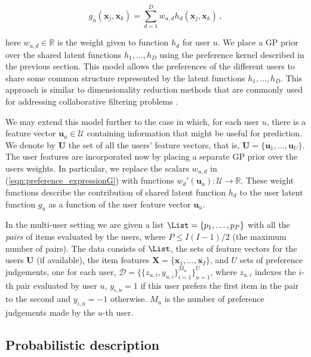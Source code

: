 \begin{equation}
	g_{u}(\mathbf{x}_j,\mathbf{x}_k)=\sum_{d=1}^{D}w_{u,d}h_{d}(\mathbf{x}_j,\mathbf{x}_k)\,,\label{eqn:preference_expressionG}
\end{equation}

here $w_{u,d}\in \mathbb{R}$ is the weight given to function $h_d$ for user $u$. We place a GP prior over the shared latent functions $h_{1},\ldots,h_{D}$ using the preference kernel described in the previous section. This model allows the preferences of the different users to share some common structure represented by the latent functions $h_{1},\ldots,h_{D}$. This approach is similar to dimensionality reduction methods that are commonly used for addressing collaborative filtering problems \cite{stern2009,raiko2007}.

We may extend this model further to the case in which, for each user $u$, there is a feature vector $\mathbf{u}_u \in \mathcal{U}$ containing information that might be useful for prediction. We denote by $\mathbf{U}$ the set of all the users' feature vectors, that is, $\mathbf{U} = \{\mathbf{u}_1,\ldots,\mathbf{u}_U\}$. The user features are incorporated now by placing a separate GP prior over the users weights. In particular, we replace the scalars $w_{u,d}$ in (\ref{eqn:preference_expressionG}) with functions $w_d'(\mathbf{u}_u):\mathcal{U}\rightarrow\mathcal{\mathbb{R}}$.  These weight functions describe the contribution of shared latent function $h_d$ to the user latent function $g_u$ as a function of the user feature vector $\mathbf{u}_u$.

In the multi-user setting we are given a list
$\List=\{p_1,\ldots,p_P\}$ with all the \emph{pairs} of items evaluated by the users, where $P\leq I(I-1)/2$ (the maximum number of pairs). The data consists of $\List$, the sets of feature vectors for the users $\mathbf{U}$ (if available), the item features $\mathbf{X}=\{\mathbf{x}_1,\ldots,\mathbf{x}_I\}$, and $U$ sets of preference judgements, one for each user, $\mathcal{D}=\{\{z_{u,i},y_{u,i}\}_{i=1}^{M_u}\}_{u=1}^{U}$, where $z_{u,i}$ indexes the $i$-th pair evaluated by user $u$, $y_{i,u}=1$ if this user prefers the first item in the pair to the second and $y_{i,u}=-1$ otherwise. $M_u$ is the number of  preference judgements made by the $u$-th user.

\subsection{Probabilistic description}

